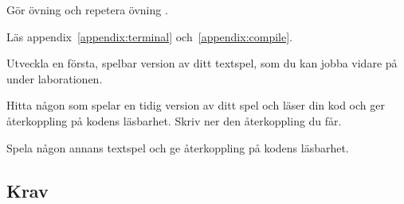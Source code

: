 
\Lab{\LabWeekTHREE}
\begin{Goals}

\end{Goals}

\begin{Preparations}
\item Gör övning \texttt{\ExeWeekTHREE} och repetera övning \texttt{\ExeWeekTWO}.
\item Läs appendix~\ref{appendix:terminal} och~\ref{appendix:compile}.

\item Utveckla en första, spelbar version av ditt textspel, som du kan jobba vidare på under laborationen.
\item Hitta någon som spelar en tidig version av ditt spel och läser din kod och ger återkoppling på kodens läsbarhet. Skriv ner den återkoppling du får.
\item Spela någon annans textspel och ge återkoppling på kodens läsbarhet.
\end{Preparations}


\subsection{Krav}

